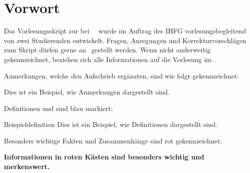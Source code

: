 \thispagestyle{vorwort}
\section*{Vorwort}
Das Vorlesungsskript zur \emph{\LectureTitle} bei \LecturerTitle~\LecturerName~wurde im Auftrag des IHFG vorlesungsbegleitend von zwei Studierenden entwickelt. Fragen, Anregungen und Korrekturvorschlägen zum Skript dürfen gerne an \ContactEmail~gestellt werden. Wenn nicht anderweitig gekennzeichnet, beziehen sich alle Informationen auf die Vorlesung im \LectureSemester.\par

Anmerkungen, welche den Aufschrieb ergänzten, sind wie folgt gekennzeichnet:
\begin{verbal}
    Dies ist ein Beispiel, wie Anmerkungen dargestellt sind.
\end{verbal}

Definitionen und  sind blau markiert:
\begin{definition}{Beispieldefinition}
    Dies ist ein Beispiel, wie Definitionen dargestellt sind.
\end{definition}

Besonders wichtige Fakten und Zusammenhänge sind rot gekennzeichnet:
\begin{important}
    \textbf{Informationen in roten Kästen sind besonders wichtig und merkenswert.}
\end{important}